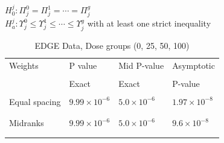 \documentclass[12pt,oneside]{report}
\theoremstyle{definition}
\theoremstyle{mystyle}
\begin{document}
$H^{j}_{0}:\Pi_{j}^{0} =\Pi_{j}^{1}= \cdots =\Pi_{j}^{g}$\\
$H^{j}_{a}: \Upsilon_{j}^{0} \leq \Upsilon_{j}^{1}\leq \cdots \leq \Upsilon_{j}^{g} $
\hspace{3mm} with at least one strict inequality\\

\begin{table}[h!]
	\begin{center}
		\caption{EDGE Data, Dose groups (0, 25, 50, 100)}
		\begin{tabular}{ l l l l}
			\hline\hline
			Weights & \hspace{0mm} P value& \hspace{0mm}Mid P-value&\hspace{0mm}Asymptotic  \\ 
			&\\
			& \hspace{0mm} Exact& \hspace{0mm}Exact&\hspace{0mm} P-value \\ \hline\hline
			&\\
			Equal spacing& \hspace{5mm}$9.99 \times 10^{-6}$ &\hspace{5mm}$5.0 \times 10^{-6}$&\hspace{5mm}$1.97 \times 10^{-8}$\\ 
			& \hspace{5mm}&\hspace{5mm}\\ \hline
			&\\
			Midranks& \hspace{5mm}$9.99 \times 10^{-6}$  &\hspace{5mm}$5.0 \times 10^{-6}$&\hspace{5mm}$9.6 \times 10^{-8}$\\
			&\\ 
			&\\ \hline \hline
			
			\hline
		\end{tabular}
		\label{tab:results}
	\end{center}
\end{table}	
\end{document}
